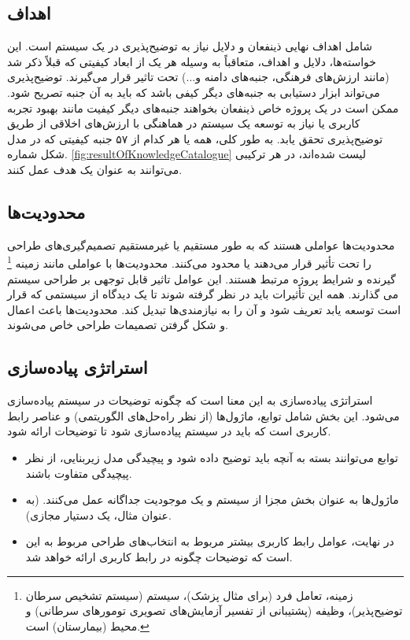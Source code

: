 \subsection{اهداف}

شامل اهداف نهایی ذینفعان و دلایل نیاز به توضیح‌پذیری در یک سیستم است. این
خواسته‌ها، دلایل و اهداف، متعاقباً به وسیله هر یک از ابعاد کیفیتی که قبلاً ذکر
شد (مانند ارزش‌های فرهنگی، جنبه‌های دامنه و...) تحت تاثیر قرار می‌گیرند.
توضیح‌پذیری می‌تواند ابزار دستیابی به جنبه‌های دیگر کیفی باشد که باید به آن جنبه
تصریح شود. ممکن است در یک پروژه خاص ذینفعان بخواهند جنبه‌های دیگر کیفیت مانند
بهبود تجربه کاربری یا نیاز به توسعه یک سیستم در هماهنگی با ارزش‌های اخلاقی از
طریق توضیح‌پذیری تحقق یابد. به طور کلی، همه یا هر کدام از ۵۷ جنبه کیفیتی که در
مدل شکل شماره. \ref{fig:resultOfKnowledgeCatalogue} لیست شده‌اند، در هر ترکیبی
می‌توانند به عنوان یک هدف عمل کنند.

\subsection{محدودیت‌ها}

محدودیت‌ها عواملی هستند که به طور مستقیم یا غیرمستقیم تصمیم‌گیری‌های طراحی را
تحت تأثیر قرار می‌دهند یا محدود می‌کنند. محدودیت‌ها با عواملی مانند زمینه
\footnote{زمینه، تعامل فرد (برای مثال پزشک)، سیستم (سیستم تشخیص سرطان
توضیح‌پذیر)، وظیفه (پشتیبانی از تفسیر آزمایش‌های تصویری تومور‌های سرطانی) و محیط
(بیمارستان) است.} گیرنده و شرایط پروژه مرتبط هستند. این عوامل تاثیر قابل توجهی
بر طراحی سیستم می گذارند. همه این تأثیرات باید در نظر گرفته شوند تا یک دیدگاه از
سیستمی که قرار است توسعه یابد تعریف شود و آن را به نیازمندی‌ها تبدیل کند.
محدودیت‌ها باعث اعمال و شکل گرفتن تصمیمات طراحی خاص می‌شوند.

\subsection{استراتژی پیاده‌سازی}

استراتژی پیاده‌سازی به این معنا است که چگونه توضیحات در سیستم پیاده‌سازی
می‌شود. این بخش شامل توابع، ماژول‌ها (از نظر راه‌حل‌های الگوریتمی) و عناصر رابط
کاربری است که باید در سیستم پیاده‌سازی شود تا توضیحات ارائه شود.

\begin{itemize}
    \item توابع می‌توانند بسته به آنچه باید توضیح داده شود و پیچیدگی مدل
    زیربنایی، از نظر پیچیدگی متفاوت باشند.
    \item ماژول‌ها به عنوان بخش مجزا از سیستم و یک موجودیت جداگانه عمل می‌کنند.
    (به عنوان مثال، یک دستیار مجازی). 
    \item در نهایت، عوامل رابط کاربری بیشتر مربوط به انتخاب‌های طراحی مربوط به
    این است که توضیحات چگونه در رابط کاربری ارائه خواهد شد.
\end{itemize}

